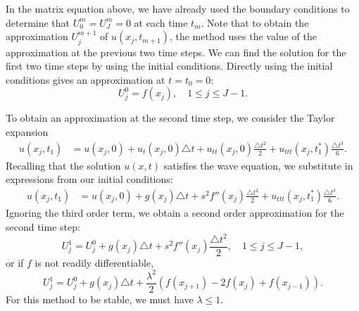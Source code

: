 In the matrix equation above, we have already used the boundary conditions to determine that 
$U_{0}^{m} = U_{J}^{m} = 0$ at each time $t_m$. 
Note that to obtain the approximation $U_{j}^{m+1}$ of $u(x_j,t_{m+1})$, the method uses the value of the approximation at the previous two time steps. We can find the solution for the first two time steps by using the initial conditions. Directly using the initial conditions gives an approximation at $t = t_0 = 0:$
\[
U_{j}^{0} = f(x_j), \quad 1 \leq j \leq J-1.
\]

To obtain an approximation at the second time step, we consider the Taylor expansion 
\begin{align*}
	u(x_j,t_1) &= u(x_j, 0) + u_t(x_j,0) \triangle t + u_{tt}(x_j,0) \frac{\triangle t^2}{2} + u_{ttt}(x_j,t_1^*) \frac{\triangle t^3}{6}.
\end{align*}
Recalling that the solution $u(x,t)$ satisfies the wave equation, we substitute in expressions from our initial conditions: 
\begin{align*}
	u(x_j,t_1) &= u(x_j, 0) +  g(x_j) \triangle t+ s^2 f''(x_j)\frac{\triangle t^2}{2} +  u_{ttt}(x_j,t_1^*) \frac{\triangle t^3}{6}.
\end{align*}
Ignoring the third order term, we obtain a second order approximation for the second time step: 
\[
U_{j}^{1}= U_{j}^{0} + g(x_j) \triangle t+ s^2 f''(x_j) \frac{\triangle t^2}{2}, \quad 1 \leq j \leq J-1,
\]
or if $f$ is not readily differentiable,
\[
U_{j}^{1}= U_{j}^{0} + g(x_j) \triangle t+ \frac{\lambda^2}{2} (f(x_{j+1}) -2 f(x_{j}) + f(x_{j-1})).
\]
For this method to be stable, we must have $\lambda \leq 1$.



